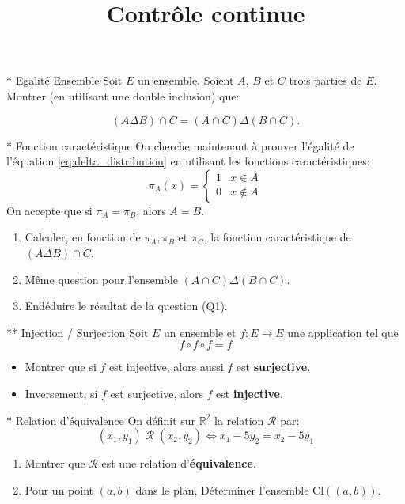 \documentclass[exam]{cs188}
\title{Contrôle continue}
\begin{document}
\newpage
\begin{problem}[2]{* Egalité Ensemble}
    \label{q1}
    Soit $E$ un ensemble. Soient $A$, $B$ et $C$ trois parties de $E$. Montrer
    (en utilisant une double inclusion) que:

    \begin{equation}
      \label{eq:delta_distribution}
      \left(A\Delta B\right)\cap C = \left(A\cap C \right) \Delta \left( B\cap
      C\right).
    \end{equation}
  \end{problem}
  \begin{problem}[2]{* Fonction caractéristique}
    On cherche maintenant à prouver l'égalité de l'équation \eqref{eq:delta_distribution}
    en utilisant les fonctions caractéristiques:
    $$\pi_A(x) =\left\{\begin{array}{ll} 1 & x\in A\\ 0 & x\notin A
    \end{array}\right.$$ On accepte que si $\pi_A = \pi_B$, alors $A = B$.
    \begin{enumerate}
      \item Calculer, en fonction de $\pi_A, \pi_B$ et $\pi_C$, la fonction
        caractéristique de $(A\Delta B)\cap C$.
      \item Même question pour l'ensemble $(A\cap C)\Delta (B \cap C)$.
      \item Endéduire le résultat de la question (Q1).
    \end{enumerate}
\end{problem}
\begin{problem}[2]{** Injection / Surjection}
 Soit $E$ un ensemble et $f: E\longrightarrow E$ une application tel que 
 \begin{equation}
   \label{eq:equality}
    f\circ f\circ f = f
 \end{equation}
 \begin{itemize}
   \item Montrer que si $f$ est injective, alors aussi $f$ est
     \textbf{surjective}.
   \item Inversement, si $f$ est surjective, alors $f$ est
     \textbf{injective}.
 \end{itemize} 
\end{problem}
\begin{problem}[2]{* Relation d'équivalence}
  On définit sur $\mathbb{R}^2$ la relation $\mathcal{R}$ par:
  \begin{equation}
    \label{eq:relation1}
    (x_1,y_1)\;\mathcal{R}\;(x_2, y_2) \iff x_1-5y_2 = x_2 - 5y_1
  \end{equation}
  \begin{enumerate}
    \item Montrer que $\mathcal{R}$ est une relation
    d'\textbf{équivalence}.
  \item Pour un point $(a,b)$ dans le plan, Déterminer l'ensemble
    $\text{Cl}\left(\left(a,b\right)\right)$.
  \end{enumerate}
\end{problem}
\end{document}
